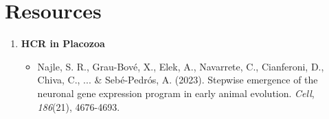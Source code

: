 \documentclass[10pt]{report}
\begin{document}
\section*{\textendash{} Resources \textendash{}}

\begin{enumerate}
	\item \textbf{HCR in Placozoa}
		\begin{itemize}
			\item Najle, S. R., Grau-Bové, X., Elek, A., Navarrete, C., Cianferoni, D., Chiva, C., ... \& Sebé-Pedrós, A. (2023). Stepwise emergence of the neuronal gene expression program in early animal evolution. \textit{Cell}, \textit{186}(21), 4676-4693. 
		\end{itemize}
\end{enumerate}
\end{document}
